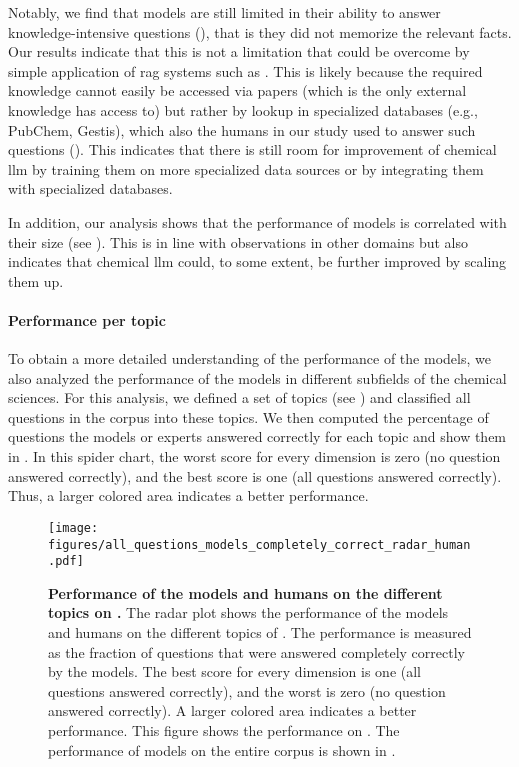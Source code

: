 \documentclass[11pt, oneside]{article}
\begin{document}
\begin{refsection}
Notably, we find that models are still limited in their ability to answer knowledge-intensive questions (), that is they did not memorize the relevant facts. Our results indicate that this is not a limitation that could be overcome by simple application of \gls{rag} systems such as \PaperQATwo. This is likely because the required knowledge cannot easily be accessed via papers (which is the only external knowledge \PaperQATwo has access to) but rather by lookup in specialized databases (e.g., PubChem, Gestis), which also the humans in our study used to answer such questions ().
This indicates that there is still room for improvement of chemical \gls{llm} by training them on more specialized data sources or by integrating them with specialized databases.

In addition, our analysis shows that the performance of models is correlated with their size (see ). This is in line with observations in other domains but also indicates that chemical \gls{llm} could, to some extent, be further improved by scaling them up.

\paragraph{Performance per topic} To obtain a more detailed understanding of the performance of the models, we also analyzed the performance of the models in different subfields of the chemical sciences.
For this analysis, we defined a set of topics (see ) and  classified all questions in the \chembench corpus into these topics.
We then computed the percentage of questions the models or experts answered correctly for each topic and show them in .
In this spider chart, the worst score for every dimension is zero (no question answered correctly), and the best score is one (all questions answered correctly). Thus, a larger colored area indicates a better performance.

\begin{figure}[!h]
    \centering
    \texttt{[image: figures/all\_questions\_models\_completely\_correct\_radar\_human.pdf]}
    \caption{\textbf{Performance of the models and humans on the different topics on \chembenchmini.} The radar plot shows the performance of the models and humans on the different topics of \chembenchmini. The performance is measured as the fraction of questions that were answered completely correctly by the models.
    The best score for every dimension is one (all questions answered correctly), and the worst is zero (no question answered correctly). A larger colored area indicates a better performance.
    This figure shows the performance on \chembenchmini. The performance of models on the entire corpus is shown in .
    }
    \label{fig:all_questions_models_completely_correct_radar_human}
\end{figure}


\end{refsection}
\end{document}
